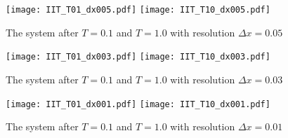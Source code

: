 \begin{figure}[h]
    \centering
    \texttt{[image: IIT\_T01\_dx005.pdf]}
    \hspace{0.05pt}
    \texttt{[image: IIT\_T10\_dx005.pdf]}
    \caption{The system after $T=0.1$ and $T=1.0$ with resolution $\Delta x=0.05$}
    \label{fig:IIT_dx005}
\end{figure}

\begin{figure}[h]
    \centering
    \texttt{[image: IIT\_T01\_dx003.pdf]}
    \hspace{0.05pt}
    \texttt{[image: IIT\_T10\_dx003.pdf]}
    \caption{The system after $T=0.1$ and $T=1.0$ with resolution $\Delta x=0.03$}
    \label{fig:IIT_dx003}
\end{figure}

\begin{figure}[h]
    \centering
    \texttt{[image: IIT\_T01\_dx001.pdf]}
    \hspace{0.05pt}
    \texttt{[image: IIT\_T10\_dx001.pdf]}
    \caption{The system after $T=0.1$ and $T=1.0$ with resolution $\Delta x=0.01$}
    \label{fig:IIT_dx001}
\end{figure}

